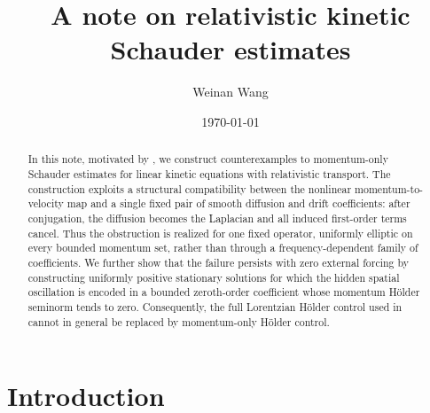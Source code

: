 \documentclass[11pt,reqno]{amsart}
\title[Relativistic momentum-only Schauder counterexamples]{A note on relativistic kinetic Schauder estimates}
\author{Weinan Wang}
\date{\today}
\numberwithin{equation}{section}
\theoremstyle{remark}
\begin{document}
\begin{abstract}
In this note, motivated by \cite{DW26}, we construct counterexamples to momentum-only Schauder estimates for linear kinetic equations with relativistic transport. The construction exploits a structural compatibility between the nonlinear momentum-to-velocity map and a single fixed pair of smooth diffusion and drift coefficients: after conjugation, the diffusion becomes the Laplacian and all induced first-order terms cancel. Thus the obstruction is realized for one fixed operator, uniformly elliptic on every bounded momentum set, rather than through a frequency-dependent family of coefficients. We further show that the failure persists with zero external forcing by constructing uniformly positive stationary solutions for which the hidden spatial oscillation is encoded in a bounded zeroth-order coefficient whose momentum H\"older seminorm tends to zero. Consequently, the full Lorentzian H\"older control used in \cite{HSTT} cannot in general be replaced by momentum-only H\"older control.

\end{abstract}


\maketitle

\section{Introduction}\label{sec:intro}
\end{document}
